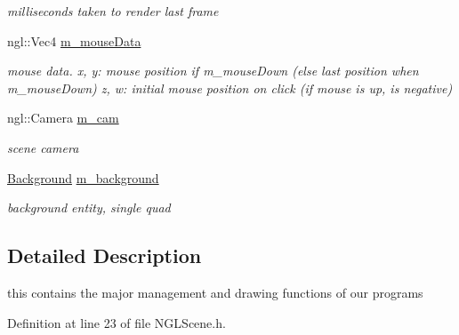 \begin{DoxyCompactItemize}
\begin{DoxyCompactList}\small\item\em milliseconds taken to render last frame \end{DoxyCompactList}\item 
\hypertarget{class_n_g_l_scene_af270fda48df0e58b244f0484f8d3ad2d}{ngl\-::\-Vec4 \hyperlink{class_n_g_l_scene_af270fda48df0e58b244f0484f8d3ad2d}{m\-\_\-mouse\-Data}}\label{class_n_g_l_scene_af270fda48df0e58b244f0484f8d3ad2d}

\begin{DoxyCompactList}\small\item\em mouse data. x, y\-: mouse position if m\-\_\-mouse\-Down (else last position when m\-\_\-mouse\-Down) z, w\-: initial mouse position on click (if mouse is up, is negative) \end{DoxyCompactList}\item 
\hypertarget{class_n_g_l_scene_a4faea2adadeaad479ff774e8345815e6}{ngl\-::\-Camera \hyperlink{class_n_g_l_scene_a4faea2adadeaad479ff774e8345815e6}{m\-\_\-cam}}\label{class_n_g_l_scene_a4faea2adadeaad479ff774e8345815e6}

\begin{DoxyCompactList}\small\item\em scene camera \end{DoxyCompactList}\item 
\hypertarget{class_n_g_l_scene_aa72ef89c47d7b79a65cd07227ed6bb17}{\hyperlink{class_background}{Background} \hyperlink{class_n_g_l_scene_aa72ef89c47d7b79a65cd07227ed6bb17}{m\-\_\-background}}\label{class_n_g_l_scene_aa72ef89c47d7b79a65cd07227ed6bb17}

\begin{DoxyCompactList}\small\item\em background entity, single quad \end{DoxyCompactList}\end{DoxyCompactItemize}


\subsection{Detailed Description}
this contains the major management and drawing functions of our programs 

Definition at line 23 of file N\-G\-L\-Scene.\-h.



